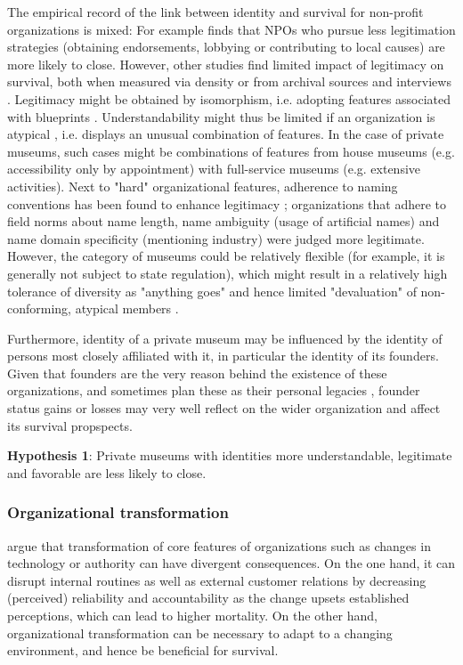 \documentclass[12pt]{article}
\begin{document}
The empirical record of the link between identity and survival for non-profit organizations is mixed: 
For example \textcite{Bielefeld_1994_survival} finds that NPOs who pursue less legitimation strategies (obtaining endorsements, lobbying or contributing to local causes) are more likely to close.
However, other studies find limited impact of legitimacy on survival, both when measured via density \parencite{Bogaert_etal_2014_ecological} or from archival sources and interviews \parencite{Fernandez_2007_dissolution}.
Legitimacy might be obtained by isomorphism, i.e. adopting features associated with blueprints \parencite{diMaggio_1983_iron}.
Understandability \parencite{Glynn_Abzug_2002_names} might thus be limited if an organization is atypical \parencite{Rosch_1975_family}, i.e. displays an unusual combination of features.
In the case of private museums, such cases might be combinations of features from house museums (e.g. accessibility only by appointment) with full-service museums (e.g. extensive activities). 
Next to "hard" organizational features, adherence to naming conventions has been found to enhance legitimacy \parencite{Glynn_Abzug_2002_names}; organizations that adhere to field norms about name length, name ambiguity (usage of artificial names) and name domain specificity (mentioning industry) were judged more legitimate. 
However, the category of museums could be relatively flexible (for example, it is generally not subject to state regulation), which might result in a relatively high tolerance of diversity as "anything goes" and hence limited "devaluation" of non-conforming, atypical members \parencite{Bogaert_etal_2014_ecological}.


Furthermore, identity of a private museum may be influenced by the identity of persons most closely affiliated with it, in particular the identity of its founders.
Given that founders are the very reason behind the existence of these organizations, and sometimes plan these as their personal legacies \parencite{Walker_2019_collector}, founder status gains or losses may very well reflect on the wider organization and affect its survival propspects.


\bigbreak
\noindent
\textbf{Hypothesis 1}: Private museums with identities more understandable, legitimate and favorable are less likely to close. 



\subsubsection*{Organizational transformation}
\label{sec:org19d4baf}
\textcite{Carroll_Khessina_2019_demography} argue that transformation of core features of organizations such as changes in technology or authority can have divergent consequences. 
On the one hand, it can disrupt internal routines as well as external customer relations by decreasing (perceived) reliability and accountability as the change upsets established perceptions, which can lead to higher mortality. 
On the other hand, organizational transformation can be necessary to adapt to a changing environment, and hence be beneficial for survival.
\end{document}
